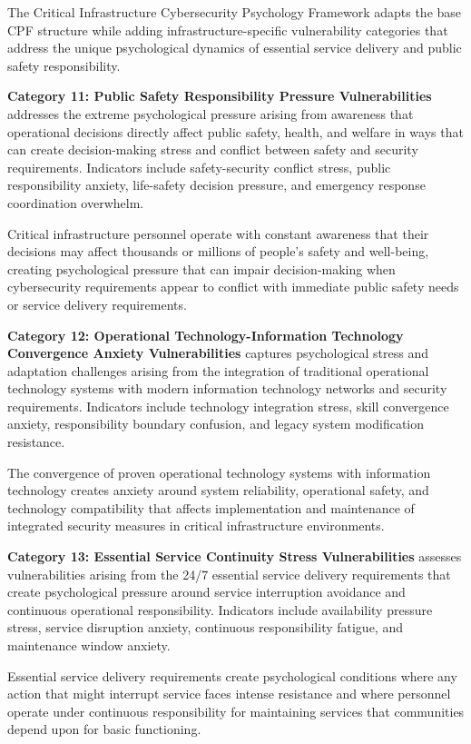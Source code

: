 \documentclass[10pt, twocolumn]{article}
\begin{document}
The Critical Infrastructure Cybersecurity Psychology Framework adapts the base CPF structure while adding infrastructure-specific vulnerability categories that address the unique psychological dynamics of essential service delivery and public safety responsibility.

\textbf{Category 11: Public Safety Responsibility Pressure Vulnerabilities} addresses the extreme psychological pressure arising from awareness that operational decisions directly affect public safety, health, and welfare in ways that can create decision-making stress and conflict between safety and security requirements. Indicators include safety-security conflict stress, public responsibility anxiety, life-safety decision pressure, and emergency response coordination overwhelm.

Critical infrastructure personnel operate with constant awareness that their decisions may affect thousands or millions of people's safety and well-being, creating psychological pressure that can impair decision-making when cybersecurity requirements appear to conflict with immediate public safety needs or service delivery requirements.

\textbf{Category 12: Operational Technology-Information Technology Convergence Anxiety Vulnerabilities} captures psychological stress and adaptation challenges arising from the integration of traditional operational technology systems with modern information technology networks and security requirements. Indicators include technology integration stress, skill convergence anxiety, responsibility boundary confusion, and legacy system modification resistance.

The convergence of proven operational technology systems with information technology creates anxiety around system reliability, operational safety, and technology compatibility that affects implementation and maintenance of integrated security measures in critical infrastructure environments.

\textbf{Category 13: Essential Service Continuity Stress Vulnerabilities} assesses vulnerabilities arising from the 24/7 essential service delivery requirements that create psychological pressure around service interruption avoidance and continuous operational responsibility. Indicators include availability pressure stress, service disruption anxiety, continuous responsibility fatigue, and maintenance window anxiety.

Essential service delivery requirements create psychological conditions where any action that might interrupt service faces intense resistance and where personnel operate under continuous responsibility for maintaining services that communities depend upon for basic functioning.
\end{document}
